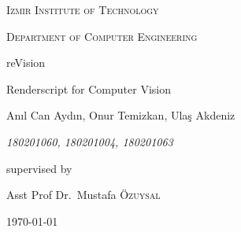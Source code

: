 \documentclass[12pt, a4paper]{article} \pagenumbering{gobble}
\begin{document}
  \begin{titlepage}
    \centering
    {\scshape\Large Izmir Institute of Technology\par}
    {\scshape\large Department of Computer Engineering\par}
    \vspace{2.5cm}
	  {\huge reVision\par}
	  \vspace{1cm}
	  {\Large Renderscript for Computer Vision\par}
	\vspace{2cm}
	{\Large An{\i}l Can Ayd{\i}n, Onur Temizkan, Ula\c{s} Akdeniz\par}
  {\itshape180201060, 180201004, 180201063\par}
	\vfill
	supervised by\par
	\large{Asst Prof Dr.~Mustafa \textsc{\"{O}zuysal}}

	\vfill

	{\large \today\par}
  \end{titlepage}
  \newpage
  \tableofcontents
\end{document}
